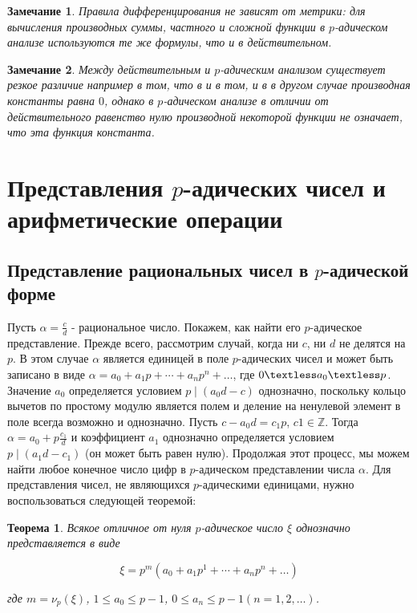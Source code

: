 \documentclass[master, och, diploma, times]{sty/SCWorks}
\theoremstyle{plain}
\newtheorem{thethm}{Теорема}[section]
\newtheorem{note}{Замечание}[section]
\theoremstyle{definition}
\begin{document}
\begin{note}
Правила дифференцирования не зависят от метрики: для вычисления производных суммы, частного и сложной функции в $p$-адическом анализе используются те же формулы, что и в действительном.
\end{note}

\begin{note}
Между действительным и $p$-адическим анализом существует резкое различие например в том, что в и в том, и в в другом случае производная константы равна $0$, однако в $p$-адическом анализе в отличии от действительного равенство нулю производной некоторой функции не означает, что эта функция константа.
\end{note}





\section{Представления $p$-адических чисел и арифметические операции}

\subsection{Представление рациональных чисел в $p$-адической форме}
Пусть $\alpha=\frac{c}{d}$ - рациональное число. Покажем, как найти его $p$-адическое представление. Прежде всего, рассмотрим случай, когда ни $c$, ни $d$ не делятся на $p$. В этом случае $\alpha$ является единицей в поле $p$-адических чисел и может быть записано в виде $\alpha=a_0+a_1p+\cdots+a_np^n+\dots $, где $0 \textless a_0 \textless p$. Значение $a_0$ определяется условием $p \mid (a_0d-c)$ однозначно, поскольку кольцо вычетов по простому модулю является полем и деление на ненулевой элемент в поле всегда возможно и однозначно. Пусть $c-a_0d=c_1p$, $c1 \in \mathbb{Z}$. Тогда $\alpha=a_0+p\frac{c_1}{d}$ и коэффициент $a_1$ однозначно определяется условием $p \mid (a_1d-c_1)$ (он может быть равен нулю). Продолжая этот процесс, мы можем найти любое конечное число цифр в $p$-адическом представлении числа $\alpha$. Для представления чисел, не являющихся $p$-адическими единицами, нужно воспользоваться следующей теоремой:

\begin{thethm}
Всякое отличное от нуля $p$-адическое число $\xi$ однозначно представляется в виде

$$
\xi=p^m(a_0+a_1p^1+\cdots+a_np^n+\dots)
$$

\noindent где $m=\nu_p(\xi)$, $1 \le a_0 \le p-1$, $0 \le a_n \le p-1$$(n=1,2,\dots)$.
\end{thethm}
\end{document}
